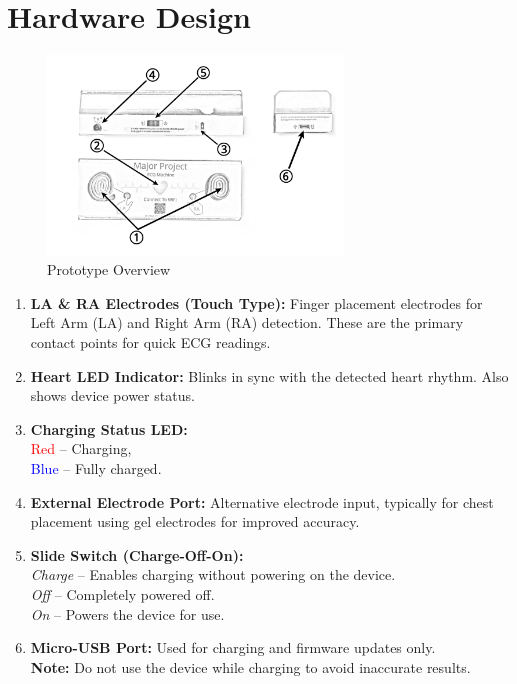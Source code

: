 \chapter{Hardware Design}

\begin{figure}[H]
    \centering
    \includegraphics[width=0.7\textwidth]{images/proto_overview.png}
    \caption{Prototype Overview}
    \label{fig:proto_overview}
\end{figure}
{\small
\begin{enumerate}
    \item \textbf{LA \& RA Electrodes (Touch Type):} Finger placement electrodes for Left Arm (LA) and Right Arm (RA) detection. These are the primary contact points for quick ECG readings.
    \item \textbf{Heart LED Indicator:} Blinks in sync with the detected heart rhythm. Also shows device power status.
    \item \textbf{Charging Status LED:} \\ \textcolor{red}{Red} – Charging,\\ \textcolor{blue}{Blue} – Fully charged.
    \item \textbf{External Electrode Port:} Alternative electrode input, typically for chest placement using gel electrodes for improved accuracy.
    \item \textbf{Slide Switch (Charge-Off-On):} \\ \textit{Charge} – Enables charging without powering on the device.\\ \textit{Off} – Completely powered off.\\ \textit{On} – Powers the device for use.
    \item \textbf{Micro-USB Port:} Used for charging and firmware updates only. \\ \textbf{Note:} Do not use the device while charging to avoid inaccurate results.
\end{enumerate}
}
